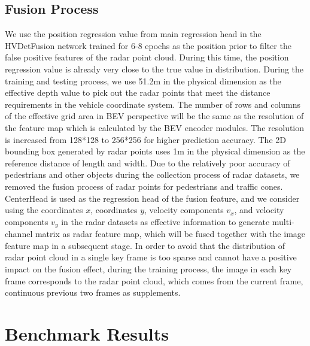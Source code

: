 \documentclass[10pt,twocolumn,letterpaper]{article}
\begin{document}
\subsection{Fusion Process}
We use the position regression value from main regression head in the HVDetFusion network trained for 6-8 epochs as the position prior to filter the false positive features of the radar point cloud. During this time, the position regression value is already very close to the true value in distribution. During the training and testing process, we use 51.2m in the physical dimension as the effective depth value to pick out the radar points that meet the distance requirements in the vehicle coordinate system. The number of rows and columns of the effective grid area in BEV perspective will be the same as  the resolution of the feature map which is calculated by the BEV encoder modules. The resolution is increased from 128*128 to 256*256 for higher prediction accuracy. The 2D bounding box generated by radar points uses 1m in the physical dimension as the reference distance of length and width. Due to the relatively poor accuracy of pedestrians and other objects during the collection process of radar datasets, we removed the fusion process of radar points for pedestrians and traffic cones. CenterHead is used as the regression head of the fusion feature, and we consider using the coordinates \(x\), coordinates \(y\), velocity components \(v_x\), and velocity components \(v_y\) in the radar datasets as effective information to generate multi-channel matrix as radar feature map, which will be fused together with the image feature map in a subsequent stage. In order to avoid that the distribution of radar point cloud in a single key frame is too sparse and cannot have a positive impact on the fusion effect, during the training process, the image in each key frame corresponds to the radar point cloud, which comes from the current frame, continuous previous two frames as supplements.
\section{Benchmark Results}
\label{sec:resu}
\end{document}
